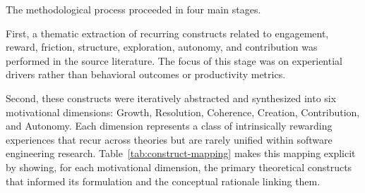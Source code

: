 \documentclass[12pt]{elsarticle}
\begin{document}
The methodological process proceeded in four main stages.

First, a thematic extraction of recurring constructs related to engagement, reward, friction, structure, exploration, autonomy, and contribution was performed in the source literature. The focus of this stage was on experiential drivers rather than behavioral outcomes or productivity metrics.

Second, these constructs were iteratively abstracted and synthesized into six motivational dimensions: Growth, Resolution, Coherence, Creation, Contribution, and Autonomy. Each dimension represents a class of intrinsically rewarding experiences that recur across theories but are rarely unified within software engineering research. Table~\ref{tab:construct-mapping} makes this mapping explicit by showing, for each motivational dimension, the primary theoretical constructs that informed its formulation and the conceptual rationale linking them.
\end{document}
